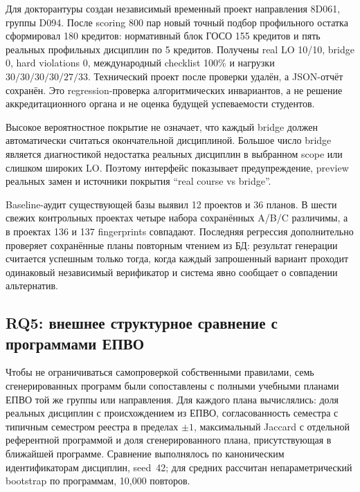 \documentclass[twoside,11pt]{article}
\begin{document}
Для докторантуры создан независимый временный проект направления 8D061,
группы D094. После scoring 800 пар новый точный подбор профильного остатка
сформировал 180 кредитов: нормативный блок ГОСО 155 кредитов и пять реальных
профильных дисциплин по 5 кредитов. Получены real LO 10/10, bridge 0,
hard violations 0, международный checklist 100\% и нагрузки
$30/30/30/30/27/33$. Технический проект после проверки удалён, а JSON-отчёт
сохранён. Это regression-проверка алгоритмических инвариантов, а не решение
аккредитационного органа и не оценка будущей успеваемости студентов.

Высокое вероятностное покрытие не означает, что каждый bridge должен автоматически считаться окончательной дисциплиной. Большое число bridge является диагностикой недостатка реальных дисциплин в выбранном scope или слишком широких LO. Поэтому интерфейс показывает предупреждение, preview реальных замен и источники покрытия ``real course vs bridge''.

Baseline-аудит существующей базы выявил 12 проектов и 36 планов. В шести свежих контрольных проектах четыре набора сохранённых A/B/C различимы, а в проектах 136 и 137 fingerprints совпадают. Последняя регрессия дополнительно проверяет сохранённые планы повторным чтением из БД: результат генерации считается успешным только тогда, когда каждый запрошенный вариант проходит одинаковый независимый верификатор и система явно сообщает о совпадении альтернатив.

\subsection{RQ5: внешнее структурное сравнение с программами ЕПВО}

Чтобы не ограничиваться самопроверкой собственными правилами, семь сгенерированных программ были сопоставлены с полными учебными планами ЕПВО той же группы или направления. Для каждого плана вычислялись: доля реальных дисциплин с происхождением из ЕПВО, согласованность семестра с типичным семестром реестра в пределах $\pm1$, максимальный Jaccard с отдельной референтной программой и доля сгенерированного плана, присутствующая в ближайшей программе. Сравнение выполнялось по каноническим идентификаторам дисциплин, seed~42; для средних рассчитан непараметрический bootstrap по программам, 10,000 повторов.
\end{document}

